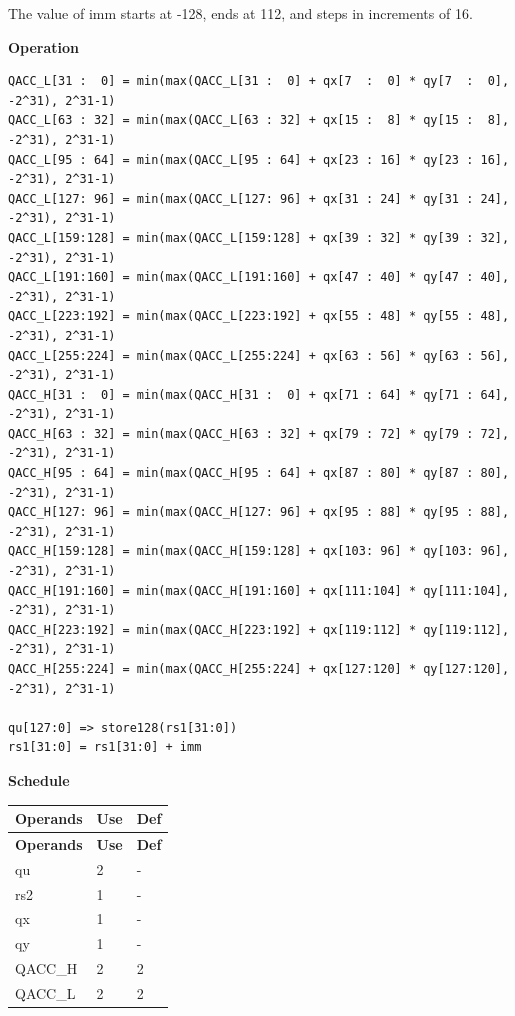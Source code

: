The value of imm starts at -128, ends at 112, and steps in increments of 16.

\textbf{Operation}\\
\begin{lstlisting}
QACC_L[31 :  0] = min(max(QACC_L[31 :  0] + qx[7  :  0] * qy[7  :  0], -2^31), 2^31-1)
QACC_L[63 : 32] = min(max(QACC_L[63 : 32] + qx[15 :  8] * qy[15 :  8], -2^31), 2^31-1)
QACC_L[95 : 64] = min(max(QACC_L[95 : 64] + qx[23 : 16] * qy[23 : 16], -2^31), 2^31-1)
QACC_L[127: 96] = min(max(QACC_L[127: 96] + qx[31 : 24] * qy[31 : 24], -2^31), 2^31-1)
QACC_L[159:128] = min(max(QACC_L[159:128] + qx[39 : 32] * qy[39 : 32], -2^31), 2^31-1)
QACC_L[191:160] = min(max(QACC_L[191:160] + qx[47 : 40] * qy[47 : 40], -2^31), 2^31-1)
QACC_L[223:192] = min(max(QACC_L[223:192] + qx[55 : 48] * qy[55 : 48], -2^31), 2^31-1)
QACC_L[255:224] = min(max(QACC_L[255:224] + qx[63 : 56] * qy[63 : 56], -2^31), 2^31-1)
QACC_H[31 :  0] = min(max(QACC_H[31 :  0] + qx[71 : 64] * qy[71 : 64], -2^31), 2^31-1)
QACC_H[63 : 32] = min(max(QACC_H[63 : 32] + qx[79 : 72] * qy[79 : 72], -2^31), 2^31-1)
QACC_H[95 : 64] = min(max(QACC_H[95 : 64] + qx[87 : 80] * qy[87 : 80], -2^31), 2^31-1)
QACC_H[127: 96] = min(max(QACC_H[127: 96] + qx[95 : 88] * qy[95 : 88], -2^31), 2^31-1)
QACC_H[159:128] = min(max(QACC_H[159:128] + qx[103: 96] * qy[103: 96], -2^31), 2^31-1)
QACC_H[191:160] = min(max(QACC_H[191:160] + qx[111:104] * qy[111:104], -2^31), 2^31-1)
QACC_H[223:192] = min(max(QACC_H[223:192] + qx[119:112] * qy[119:112], -2^31), 2^31-1)
QACC_H[255:224] = min(max(QACC_H[255:224] + qx[127:120] * qy[127:120], -2^31), 2^31-1)

qu[127:0] => store128(rs1[31:0])
rs1[31:0] = rs1[31:0] + imm
\end{lstlisting}

\textbf{Schedule}\\
\begin{longtable}[c]{|l|l|l|}
    \hline
    \rowcolor{lightgray}
    \textbf{Operands} & \textbf{Use} & \textbf{Def} \\\hline
    \endfirsthead
    \hline
    \rowcolor{lightgray}
     \textbf{Operands} & \textbf{Use} & \textbf{Def} \\\hline
    \endhead
    \hline
    \endfoot

    qu & 2 & - \\\hline
    rs2 & 1 & - \\\hline
     qx & 1 & - \\\hline
     qy & 1 & - \\\hline
     QACC\_H & 2 & 2 \\\hline
     QACC\_L & 2 & 2

\end{longtable}

